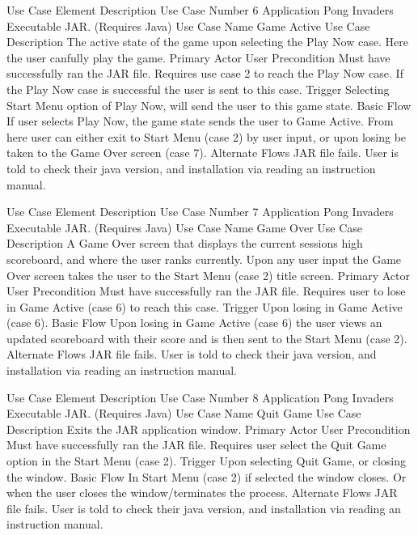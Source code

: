 \documentclass[12pt, titlepage]{article}
\begin{document}
Use Case Element
Description
Use Case Number
6
Application
Pong Invaders Executable JAR. (Requires Java)
Use Case Name
Game Active
Use Case Description
The active state of the game upon selecting the Play Now case. Here the user
canfully play the game.
Primary Actor
User 
Precondition
Must have successfully ran the JAR file. Requires use case 2 to reach the Play
Now case. If the Play Now case is successful the user is sent to this case.
Trigger
Selecting Start Menu option of Play Now, will send the user to this game state.
Basic Flow
If user selects Play Now, the game state sends the user to Game Active. From
here user can either exit to Start Menu (case 2) by user input, or upon losing
be taken to the Game Over screen (case 7).
Alternate Flows
JAR file fails. User is told to check their java version, and installation via
reading an instruction manual.



Use Case Element
Description
Use Case Number
7
Application
Pong Invaders Executable JAR. (Requires Java)
Use Case Name
Game Over
Use Case Description
A Game Over screen that displays the current sessions high scoreboard, and
where the user ranks currently. Upon any user input the Game Over screen takes
the
user to the Start Menu (case 2) title screen.
Primary Actor
User 
Precondition
Must have successfully ran the JAR file. Requires user to lose in Game Active
(case 6) to reach this case.
Trigger
Upon losing in Game Active (case 6).
Basic Flow
Upon losing in Game Active (case 6) the user views an updated scoreboard with
their score and is then sent to the Start Menu (case 2).
Alternate Flows
JAR file fails. User is told to check their java version, and installation via
reading an instruction manual.


Use Case Element
Description
Use Case Number
8
Application
Pong Invaders Executable JAR. (Requires Java)
Use Case Name
Quit Game
Use Case Description
Exits the JAR application window.
Primary Actor
User 
Precondition
Must have successfully ran the JAR file. Requires user select the Quit Game
option in the Start Menu (case 2).
Trigger
Upon selecting Quit Game, or closing the window.
Basic Flow
In Start Menu (case 2) if selected the window closes. Or when the user closes
the window/terminates the process.
Alternate Flows
JAR file fails. User is told to check their java version, and installation via
reading an instruction manual.
\end{document}
